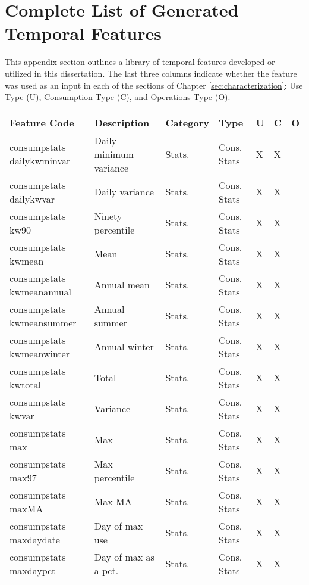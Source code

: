 \chapter{Complete List of Generated Temporal Features}
\label{sec:temporalfeaturelist}

This appendix section outlines a library of temporal features developed or utilized in this dissertation. The last three columns indicate whether the feature was used as an input in each of the sections of Chapter \ref{sec:characterization}: Use Type (U), Consumption Type (C), and Operations Type (O).

{\scriptsize
{\scriptsize

\begin{longtable}[l]{ | p{4cm} | p{4cm} | p{1cm} | p{2cm} | p{0.3cm} | p{0.3cm} | p{0.3cm} |}
\hline
	Feature Code & Description & Category & Type & U & C & O \\ \hline
	 consumpstats dailykwminvar & Daily minimum variance & Stats. & Cons. Stats & X & X & \  \\ \hline
	 consumpstats dailykwvar & Daily variance & Stats. & Cons. Stats & X & X & \  \\ \hline
	 consumpstats kw90 & Ninety percentile & Stats. & Cons. Stats & X & X & \  \\ \hline
	 consumpstats kwmean & Mean & Stats. & Cons. Stats & X & X & \  \\ \hline
	 consumpstats kwmeanannual & Annual mean & Stats. & Cons. Stats & X & X & \  \\ \hline
	 consumpstats kwmeansummer & Annual summer & Stats. & Cons. Stats & X & X & \  \\ \hline
	 consumpstats kwmeanwinter & Annual winter & Stats. & Cons. Stats & X & X & \  \\ \hline
	 consumpstats kwtotal & Total & Stats. & Cons. Stats & X & X & \  \\ \hline
	 consumpstats kwvar & Variance & Stats. & Cons. Stats & X & X & \  \\ \hline
	 consumpstats max & Max & Stats. & Cons. Stats & X & X & \  \\ \hline
	 consumpstats max97 & Max percentile & Stats. & Cons. Stats & X & X & \  \\ \hline
	 consumpstats maxMA & Max MA & Stats. & Cons. Stats & X & X & \  \\ \hline
	 consumpstats maxdaydate & Day of max use & Stats. & Cons. Stats & X & X & \  \\ \hline
	 consumpstats maxdaypct & Day of max as a pct. & Stats. & Cons. Stats & X & X & \  \\ \hline

\end{longtable}}}
